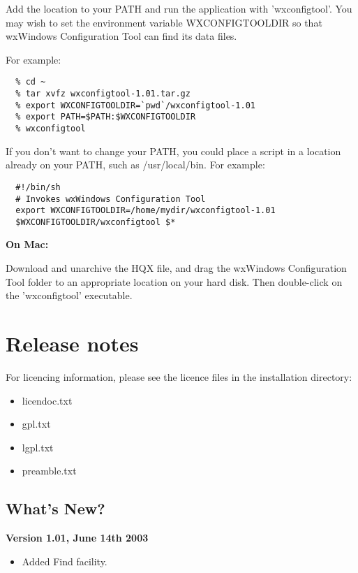Add the location to your PATH and run the application with
'wxconfigtool'. You may wish to set the environment variable
WXCONFIGTOOLDIR so that wxWindows Configuration Tool can find its data files.

For example:

\begin{verbatim}
  % cd ~
  % tar xvfz wxconfigtool-1.01.tar.gz
  % export WXCONFIGTOOLDIR=`pwd`/wxconfigtool-1.01
  % export PATH=$PATH:$WXCONFIGTOOLDIR
  % wxconfigtool
\end{verbatim}

If you don't want to change your PATH, you could place a
script in a location already on your PATH, such as
/usr/local/bin. For example:

\begin{verbatim}
  #!/bin/sh
  # Invokes wxWindows Configuration Tool
  export WXCONFIGTOOLDIR=/home/mydir/wxconfigtool-1.01
  $WXCONFIGTOOLDIR/wxconfigtool $*
\end{verbatim}

{\bf On Mac:}

Download and unarchive the HQX file, and drag the wxWindows Configuration Tool folder to an appropriate location
on your hard disk. Then double-click on the 'wxconfigtool' executable.

\chapter{Release notes}\label{releasenotes}%
%
\setfooter{\thepage}{}{}{}{}{\thepage}%

For licencing information, please see
the licence files in the installation directory:

\begin{itemize}\itemsep=0pt
\item licendoc.txt
\item gpl.txt
\item lgpl.txt
\item preamble.txt
\end{itemize}

\section{What's New?}\label{whatsnew}

{\bf Version 1.01, June 14th 2003}

\begin{itemize}\itemsep=10pt
\item Added Find facility.
\end{itemize}

